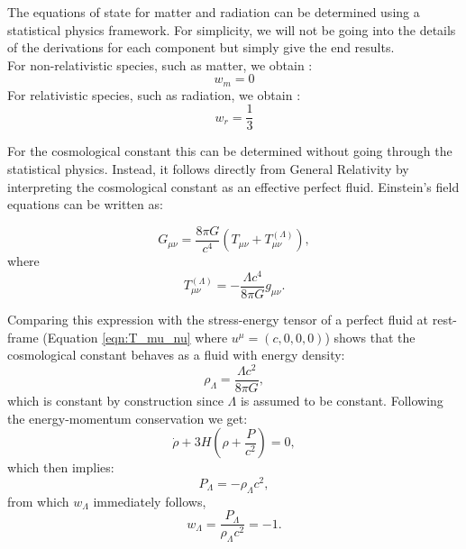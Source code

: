 The equations of state for matter and radiation can be determined using a statistical physics framework. 
For simplicity, we will not be going into the details of the derivations for each component but simply give the end 
results. \\
\noindent For non-relativistic species, such as matter, we obtain :
\begin{equation}
    w_m = 0
\end{equation}
\noindent For relativistic species, such as radiation, we obtain :
\begin{equation}
    w_r = \frac{1}{3}
\end{equation}

\noindent For the cosmological constant this can be determined without going through the statistical physics. 
Instead, it follows directly from General Relativity by interpreting the cosmological constant as an effective perfect fluid. 
Einstein's field equations can be written as:

\begin{equation}
    G_{\mu\nu}
    =
    \frac{8\pi G}{c^4}
    \left(
    T_{\mu\nu}
    +
    T_{\mu\nu}^{(\Lambda)}
    \right),
\end{equation}
where
\begin{equation}
    T_{\mu\nu}^{(\Lambda)}
    =
    -\frac{\Lambda c^4}{8\pi G}g_{\mu\nu}.
\end{equation}

\noindent Comparing this expression with the stress-energy tensor of a perfect fluid at rest-frame (Equation \ref{eqn:T_mu_nu} where $u^{\mu} = (c,0,0,0)$) 
shows that the cosmological constant behaves as a fluid with energy density:
\begin{equation}
    \rho_{\Lambda}
    =
    \frac{\Lambda c^2}{8\pi G},
\end{equation}
\noindent which is constant by construction since $\Lambda$ is assumed to be constant. Following the energy-momentum conservation we get:
\begin{equation}
    \dot{\rho}
    +
    3H\left(\rho+\frac{P}{c^2}\right)
    =
    0,
\end{equation}
\noindent which then implies:
\begin{equation}
    P_{\Lambda}
    =
    -\rho_{\Lambda}c^2,
\end{equation}
\noindent from which $w_{\Lambda}$ immediately follows,
\begin{equation}
    w_{\Lambda}
    =
    \frac{P_{\Lambda}}{\rho_{\Lambda}c^2}
    =
    -1.
\end{equation}

